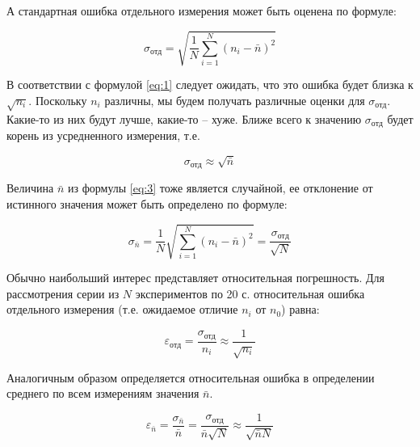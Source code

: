 \documentclass[a4paper, 12pt]{article}
\begin{document}
А стандартная ошибка отдельного измерения может быть оценена по формуле:

\begin{equation} \label{eq:4}
    \sigma_{отд} = \sqrt {\frac{1}{N} \sum_{i=1}^N ({n_i - \bar{n}})^2}
\end{equation}

В соответствии с формулой \eqref{eq:1} следует ожидать, что это ошибка будет близка к $\sqrt{n_i}$.  Поскольку $n_i$ различны, мы будем получать различные оценки для $\sigma_{отд}$. Какие-то из них будут лучше, какие-то -- хуже. Ближе всего к значению $\sigma_{отд}$ будет корень из усредненного измерения, т.е.

\begin{equation} \label{eq:5}
    \sigma_{отд} \approx \sqrt{\bar{n}}
\end{equation}

Величина $\bar{n}$ из формулы \eqref{eq:3} тоже является случайной, ее отклонение от истинного значения может быть определено по формуле:

\begin{equation} \label{eq:6}
    \sigma_{\bar{n}} = \frac{1}{N} \sqrt {\sum_{i=1}^N ({n_i - \bar{n}})^2} = \frac {\sigma_{отд}}{\sqrt {N}}
\end{equation}

Обычно наибольший интерес представляет относительная погрешность. Для рассмотрения серии из $N$ экспериментов по 20 с. относительная ошибка отдельного измерения (т.е. ожидаемое отличие $n_i$ от $n_0$) равна:

\begin{equation} \label{eq:7}
   \varepsilon_{отд} = \frac {\sigma_{отд}}{n_i} \approx \frac {1}{\sqrt {n_i}}
\end{equation}

Аналогичным образом определяется относительная ошибка в определении среднего по всем измерениям значения $\bar{n}$.

\begin{equation} \label{eq:8}
    \varepsilon_{\bar{n}} = \frac {\sigma_{\bar{n}}}{\bar{n}} = \frac {\sigma_{отд}}{\bar{n} \sqrt {N}} \approx \frac {1}{\sqrt {\bar {n} N}}
\end{equation}
\end{document}
